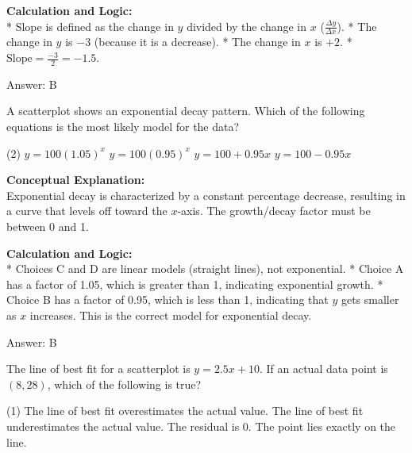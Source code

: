 \documentclass[11pt,paper=a4,answers]{exam}
\begin{document}
\begin{questions}
\begin{solution}
\textbf{Calculation and Logic:} \\
* Slope is defined as the change in $y$ divided by the change in $x$ ($\frac{\Delta y}{\Delta x}$).
* The change in $y$ is $-3$ (because it is a decrease).
* The change in $x$ is $+2$.
* $\text{Slope} = \frac{-3}{2} = -1.5$.

\vspace{30pt}

Answer: \colorbox{yellow!100}{B}
\end{solution}

\vspace{60pt}

\question
A scatterplot shows an exponential decay pattern. Which of the following equations is the most likely model for the data?
\begin{tasks}(2)
    \task $y = 100(1.05)^x$
    \task $y = 100(0.95)^x$
    \task $y = 100 + 0.95x$
    \task $y = 100 - 0.95x$
\end{tasks}

\begin{solution}
\textbf{Conceptual Explanation:} \\
Exponential decay is characterized by a constant percentage decrease, resulting in a curve that levels off toward the $x$-axis. The growth/decay factor must be between 0 and 1.

\vspace{30pt}

\textbf{Calculation and Logic:} \\
* Choices C and D are linear models (straight lines), not exponential.
* Choice A has a factor of 1.05, which is greater than 1, indicating exponential growth.
* Choice B has a factor of 0.95, which is less than 1, indicating that $y$ gets smaller as $x$ increases. This is the correct model for exponential decay.

\vspace{30pt}

Answer: \colorbox{yellow!100}{B}
\end{solution}

\vspace{60pt}

\question
The line of best fit for a scatterplot is $y = 2.5x + 10$. If an actual data point is $(8, 28)$, which of the following is true?
\begin{tasks}(1)
    \task The line of best fit overestimates the actual value.
    \task The line of best fit underestimates the actual value.
    \task The residual is 0.
    \task The point lies exactly on the line.
\end{tasks}


\end{questions}
\end{document}
